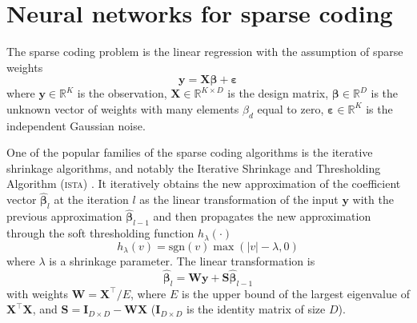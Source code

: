 \documentclass{article}
\begin{document}

\section{Neural networks for sparse coding}
\label{sec:nn_sc}
The sparse coding problem is the linear regression with the assumption of sparse weights
\begin{equation}
\label{eq:regression_problem}
\mathbf{y} = \mathbf{X}\boldsymbol\beta + \boldsymbol\varepsilon
\end{equation}
where $\mathbf{y} \in \mathbb{R}^K$ is the observation, $\mathbf{X} \in \mathbb{R}^{K \times D}$ is the design matrix, $\boldsymbol\beta \in \mathbb{R}^D$ is the unknown vector of weights with many elements $\beta_d$ equal to zero, $\boldsymbol\varepsilon \in \mathbb{R}^K$ is the independent Gaussian noise.

One of the popular families of the sparse coding algorithms is the iterative shrinkage algorithms, and notably the Iterative Shrinkage and Thresholding Algorithm (\textsc{ista}) \citep{daubechies2004iterative}. It iteratively obtains the new approximation of the coefficient vector $\widehat{\boldsymbol\beta}_l$ at the iteration $l$ as the linear transformation of the input $\mathbf{y}$ with the previous approximation $\widehat{\boldsymbol\beta}_{l-1}$ and then propagates the new approximation through the soft thresholding function $h_\lambda(\cdot)$
\begin{equation}
h_\lambda(v) = \text{sgn}(v) \max(|v| - \lambda, 0)
\end{equation}
where $\lambda$ is a shrinkage parameter.
The linear transformation is
\begin{equation}
\widehat{\boldsymbol\beta}_l = \mathbf{W}\mathbf{y} + \mathbf{S}\widehat{\boldsymbol\beta}_{l-1}
\end{equation}
with weights $\mathbf{W} = \mathbf{X}^\top / E$, where $E$ is the upper bound of the largest eigenvalue of $\mathbf{X}^\top\mathbf{X}$, and $\mathbf{S} = \mathbf{I}_{D \times D} - \mathbf{W}\mathbf{X}$ ($\mathbf{I}_{D \times D}$ is the identity matrix of size $D$).
\end{document}
